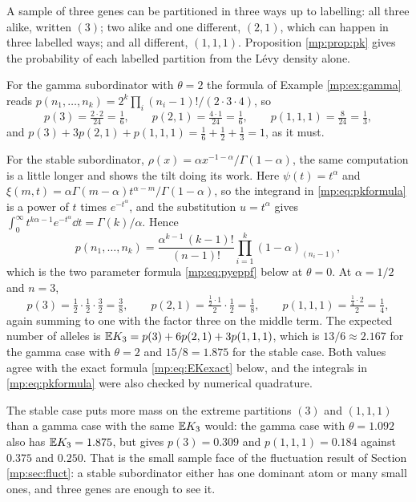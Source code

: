 \begin{example}[Kingman's correspondence at $n=3$]
\label{mp:ex:kingman3}
A sample of three genes can be partitioned in three ways up to labelling: all three alike,
written $(3)$; two alike and one different, $(2,1)$, which can happen in three labelled
ways; and all different, $(1,1,1)$. Proposition \ref{mp:prop:pk} gives the probability of
each labelled partition from the L\'evy density alone.

For the gamma subordinator with $\theta=2$ the formula of Example \ref{mp:ex:gamma} reads
$p(n_1,\dots,n_k)=2^k\prod_i(n_i-1)!/(2\cdot3\cdot4)$, so
\[
p(3)=\tfrac{2\cdot2}{24}=\tfrac16,\qquad
p(2,1)=\tfrac{4\cdot1}{24}=\tfrac16,\qquad
p(1,1,1)=\tfrac{8}{24}=\tfrac13 ,
\]
and $p(3)+3p(2,1)+p(1,1,1)=\tfrac16+\tfrac12+\tfrac13=1$, as it must.

For the stable subordinator, $\rho(x)=\alpha x^{-1-\alpha}/\Gamma(1-\alpha)$, the same
computation is a little longer and shows the tilt doing its work. Here $\psi(t)=t^\alpha$ and
$\xi(m,t)=\alpha\Gamma(m-\alpha)t^{\alpha-m}/\Gamma(1-\alpha)$, so the integrand in
\eqref{mp:eq:pkformula} is a power of $t$ times $e^{-t^\alpha}$, and the substitution
$u=t^\alpha$ gives $\int_0^\infty t^{k\alpha-1}e^{-t^\alpha}\dd t=\Gamma(k)/\alpha$. Hence
\[
p(n_1,\dots,n_k)=\frac{\alpha^{k-1}\,(k-1)!}{(n-1)!}\prod_{i=1}^k(1-\alpha)_{(n_i-1)} ,
\]
which is the two parameter formula \eqref{mp:eq:pyeppf} below at $\theta=0$. At
$\alpha=1/2$ and $n=3$,
\[
p(3)=\tfrac12\cdot\tfrac12\cdot\tfrac32=\tfrac38,\qquad
p(2,1)=\tfrac{\frac12\cdot1}{2}\cdot\tfrac12=\tfrac18,\qquad
p(1,1,1)=\tfrac{\frac14\cdot2}{2}=\tfrac14 ,
\]
again summing to one with the factor three on the middle term. The expected number of
alleles is $\mathbb{E} K_3=p(3)+6p(2,1)+3p(1,1,1)$, which is $13/6\approx2.167$ for the gamma case
with $\theta=2$ and $15/8=1.875$ for the stable case. Both values agree with the exact
formula \eqref{mp:eq:EKexact} below, and the integrals in \eqref{mp:eq:pkformula} were also
checked by numerical quadrature.

The stable case puts more mass on the extreme partitions $(3)$ and $(1,1,1)$ than a gamma
case with the same $\mathbb{E} K_3$ would: the gamma case with $\theta=1.092$ also has
$\mathbb{E} K_3=1.875$, but gives $p(3)=0.309$ and $p(1,1,1)=0.184$ against $0.375$ and $0.250$. That is the small sample face of the fluctuation result
of Section \ref{mp:sec:fluct}: a stable subordinator either has one dominant atom or many
small ones, and three genes are enough to see it.
\end{example}

